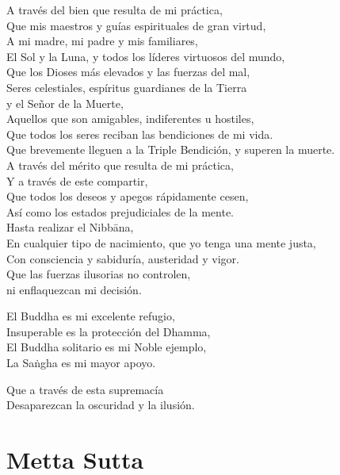 A través del bien que resulta de mi práctica,\\
Que mis maestros y guías espirituales de gran virtud,\\
A mi madre, mi padre y mis familiares,\\
El Sol y la Luna, y todos los líderes virtuosos del mundo,\\
Que los Dioses más elevados y las fuerzas del mal,\\
Seres celestiales, espíritus guardianes de la Tierra\\ \vin y el Señor de la Muerte,\\
Aquellos que son amigables, indiferentes u hostiles,\\
Que todos los seres reciban las bendiciones de mi vida.\\
Que brevemente lleguen a la Triple Bendición, y superen la muerte.\\
A través del mérito que resulta de mi práctica,\\
Y a través de este compartir,\\
Que todos los deseos y apegos rápidamente cesen,\\
Así como los estados prejudiciales de la mente.\\
Hasta realizar el Nibbāna,\\
En cualquier tipo de nacimiento, que yo tenga una mente justa,\\
Con consciencia y sabiduría, austeridad y vigor.\\
Que las fuerzas ilusorias no controlen,\\
\vin ni enflaquezcan mi decisión.

El Buddha es mi excelente refugio,\\
Insuperable es la protección del Dhamma,\\
El Buddha solitario es mi Noble ejemplo,\\
La Saṅgha es mi mayor apoyo.

Que a través de esta supremacía\\
Desaparezcan la oscuridad y la ilusión.

\chapter*[Metta Sutta]{Metta Sutta}

\delegateSetUseNext


\begin{leader}
\end{leader}

